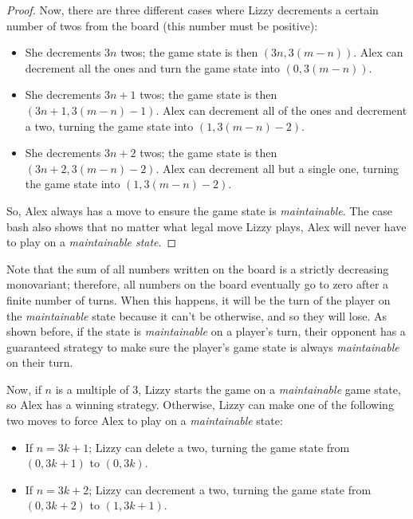 \documentclass[10pt]{../usamts}
\begin{document}
\begin{solution}
\begin{proof}
    Now, there are three different cases where Lizzy decrements a certain number of twos from the board (this number must be positive):
    \begin{itemize}
        \item She decrements $3n$ twos; the game state is then $(3n, 3(m-n))$. Alex can decrement all the ones and turn the game state into $(0, 3(m-n))$.
        \item She decrements $3n+1$ twos; the game state is then $(3n+1, 3(m-n)-1)$. Alex can decrement all of the ones and decrement a two, turning the game state into $(1, 3(m-n)-2)$.
        \item She decrements $3n+2$ twos; the game state is then $(3n+2, 3(m-n)-2)$. Alex can decrement all but a single one, turning the game state into $(1, 3(m-n)-2)$.
    \end{itemize}

    So, Alex always has a move to ensure the game state is \textit{maintainable}. The case bash also shows that no matter what legal move Lizzy plays, Alex will never have to play on a \textit{maintainable state}.
\end{proof}

Note that the sum of all numbers written on the board is a strictly decreasing monovariant; therefore, all numbers on the board eventually go to zero after a finite number of turns. When this happens, it will be the turn of the player on the \textit{maintainable} state because it can't be otherwise, and so they will lose. As shown before, if the state is \textit{maintainable} on a player's turn, their opponent has a guaranteed strategy to make sure the player's game state is always \textit{maintainable} on their turn.

Now, if $n$ is a multiple of 3, Lizzy starts the game on a \textit{maintainable} game state, so Alex has a winning strategy. Otherwise, Lizzy can make one of the following two moves to force Alex to play on a \textit{maintainable} state:

\begin{itemize}
    \item If $n = 3k+1$; Lizzy can delete a two, turning the game state from $(0, 3k+1)$ to $(0, 3k)$.
    \item If $n = 3k+2$; Lizzy can decrement a two, turning the game state from $(0,3k+2)$ to $(1,3k+1)$.
\end{itemize}

\end{solution}
\end{document}
